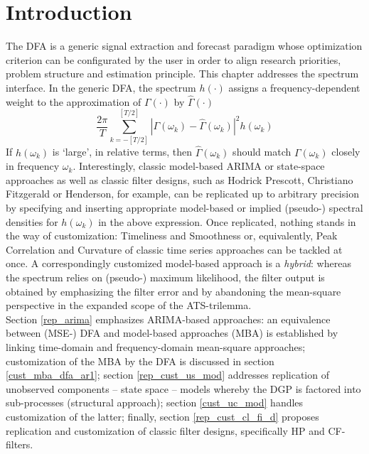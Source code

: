 \documentclass[a4paper]{book}
\begin{document}
\section{Introduction}



The DFA is a generic signal extraction and forecast paradigm whose optimization criterion can be configurated by the user in order to align research priorities, problem structure and estimation principle. This chapter addresses the spectrum interface. In the generic DFA, the spectrum $h(\cdot)$ assigns a frequency-dependent weight to the approximation of $\Gamma(\cdot)$ by $\hat{\Gamma}(\cdot)$
\[\frac{2\pi}{T}\sum_{k=-[T/2]}^{[T/2]}\left|\Gamma(\omega_k)-\hat{\Gamma}(\omega_k) \right|^2 h(\omega_k)\]
If $h(\omega_k)$ is `large', in relative terms, then $\hat{\Gamma}(\omega_k) $ should match $\Gamma(\omega_k)$ closely in frequency $\omega_k$.
Interestingly, classic model-based ARIMA or state-space approaches  as well as classic filter designs, such as Hodrick Prescott, Christiano Fitzgerald or Henderson, for example, can be replicated up to arbitrary precision by specifying and inserting appropriate model-based or implied (pseudo-) spectral densities for $h(\omega_k)$ in the above expression. Once replicated, nothing stands in the way of customization: Timeliness and Smoothness or, equivalently, Peak Correlation and Curvature of classic time series approaches can be tackled at once.  A correspondingly customized model-based approach is a \emph{hybrid}: whereas the spectrum relies on (pseudo-) maximum likelihood, the filter output is obtained by emphasizing the filter error and by abandoning the mean-square perspective in the expanded scope of the ATS-trilemma. \\

Section \ref{rep_arima} emphasizes ARIMA-based approaches: an equivalence between (MSE-) DFA and model-based approaches (MBA) is established by linking time-domain and frequency-domain mean-square approaches; customization of the MBA by the DFA is discussed in section \ref{cust_mba_dfa_ar1}; section \ref{rep_cust_us_mod} addresses replication of unobserved components -- state space -- models whereby the DGP is factored into sub-processes (structural approach); section \ref{cust_uc_mod} handles customization of the latter; finally, section \ref{rep_cust_cl_fi_d} proposes replication and customization of classic filter designs, specifically HP and CF-filters.
\end{document}
